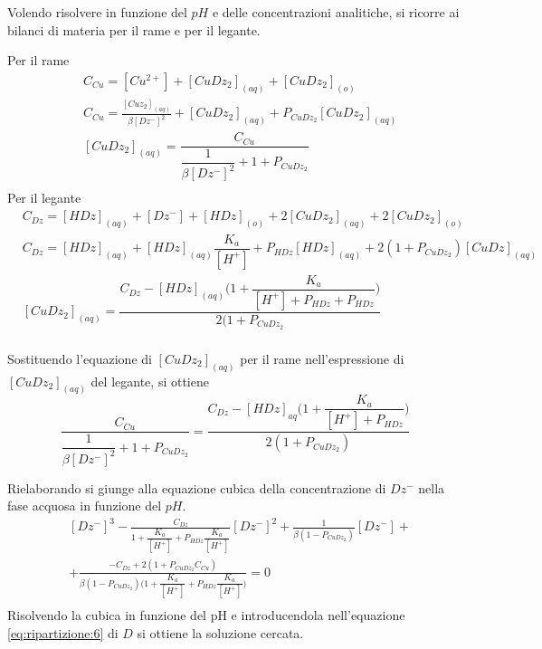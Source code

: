 
Volendo risolvere in funzione del $pH$ e delle concentrazioni analitiche, si ricorre ai bilanci di materia per il rame e per il legante.

Per il rame
\begin{align*}
& C_{Cu} = [Cu^{2+}] + [CuDz_2]_{(aq)} + [CuDz_2]_{(o)}\\
& C_{Cu} = \frac{[Cuz_2]_{(aq)}}{\beta [Dz^-]^2} + [CuDz_2]_{(aq)} + P_{CuDz_2} [CuDz_2]_{(aq)}\\
& [CuDz_2]_{(aq)} = \dfrac{C_{Cu}}{\dfrac{1}{\beta [Dz^-]^2} + 1 + P_{CuDz_2}}\\
\end{align*}
Per il legante
\begin{align*}
& C_{Dz} = [HDz]_{(aq)} + [Dz^-] + [HDz]_{(o)} + 2[CuDz_2]_{(aq)} + 2 [CuDz_2]_{(o)}\\
& C_{Dz} = [HDz]_{(aq)} + [HDz]_{(aq)} \dfrac{K_a}{[H^+]} + P_{HDz} [HDz]_{(aq)} + 2(1 + P_{CuDz_2})[CuDz]_{(aq)}\\
& [CuDz_2]_{(aq)} = \dfrac{C_{Dz} - [HDz]_{(aq)} \biggl(1 + \dfrac{K_a}{[H^+] + P_{HDz} + P_{HDz}}\biggr)}{2(1 + P_{CuDz_2}}\\
\end{align*}

Sostituendo l'equazione di $[CuDz_2]_{(aq)}$ per il rame nell'espressione di $[CuDz_2]_{(aq)}$ del legante, si ottiene
\[
\frac{C_{Cu}}{\dfrac{1}{\beta [Dz^-]^2} + 1 + P_{CuDz_2}} = \frac{C_{Dz} - [HDz]_{aq} \biggl(1 + \dfrac{K_a}{[H^+] + P_{HDz}}\biggr)}{2 (1 + P_{CuDz_2})}
\]

Rielaborando si giunge alla equazione cubica della concentrazione di $Dz^-$ nella fase acquosa in funzione del $pH$.
\[
\begin{split}
&[Dz^-]^3 - \frac{C_{Dz}}{1 + \dfrac{K_a}{[H^+]} + P_{HDz} \dfrac{K_a}{[H^+]}} [Dz^-]^2 + \frac{1}{\beta (1 - P_{CuDz_2})} [Dz^-] + \\
& + \frac{-C_{Dz} + 2(1 + P_{CuDz_2}C_{Cu})}{\beta (1 - P_{CuDz_2}) \biggl(1 + \dfrac{K_a}{[H^+]} + P_{HDz} \dfrac{K_a}{[H^+]}\biggr)} = 0\\
\end{split}
\]
Risolvendo la cubica in funzione del pH e introducendola nell'equazione \ref{eq:ripartizione:6} di $D$ si ottiene la soluzione cercata.

